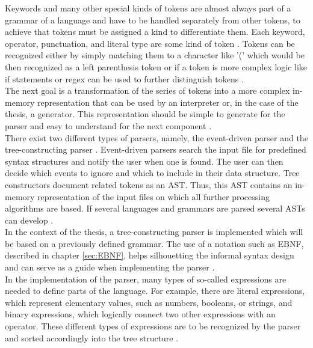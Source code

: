 Keywords and many other special kinds of tokens are almost always part of a grammar of a language and have to be handled separately from other tokens, to achieve that tokens must be assigned a kind to differentiate them. Each keyword, operator, punctuation, and literal type are some kind of token \parencite[cf.][p. 43]{nystrom_crafting_2021}. Tokens can be recognized either by simply matching them to a character like '(' which would be then recognized as a left parenthesis token or if a token is more complex logic like if statements or regex can be used to further distinguish tokens \parencite[see][pp. 47-54]{nystrom_crafting_2021}.\\
The next goal is a transformation of the series of tokens into a more complex in-memory representation that can be used by an interpreter or, in the case of the thesis, a generator. This representation should be simple to generate for the parser and easy to understand for the next component \parencite[cf.][p. 59]{nystrom_crafting_2021}.\\
There exist two different types of parsers, namely, the event-driven parser and the tree-constructing parser \parencite[cf.][p. 5]{sarkar_code_2001}. Event-driven parsers search the input file for predefined syntax structures and notify the user when one is found. The user can then decide which events to ignore and which to include in their data structure. Tree constructors document related tokens as an \ac{AST}. Thus, this \ac{AST} contains an in-memory representation of the input files on which all further processing algorithms are based. If several languages and grammars are parsed several \ac{AST}s can develop \parencite[cf.][pp. 5-6]{sarkar_code_2001}.\\
In the context of the thesis, a tree-constructing parser is implemented which will be based on a previously defined grammar. The use of a notation such as \ac{EBNF}, described in chapter \ref{sec:EBNF}, helps silhouetting the informal syntax design and can serve as a guide when implementing the parser \parencite[cf.][p. 64]{nystrom_crafting_2021}.\\
In the implementation of the parser, many types of so-called expressions are needed to define parts of the language. For example, there are literal expressions, which represent elementary values, such as numbers, booleans, or strings, and binary expressions, which logically connect two other expressions with an operator. These different types of expressions are to be recognized by the parser and sorted accordingly into the tree structure \parencite[see][pp. 64-68]{nystrom_crafting_2021}.\\
